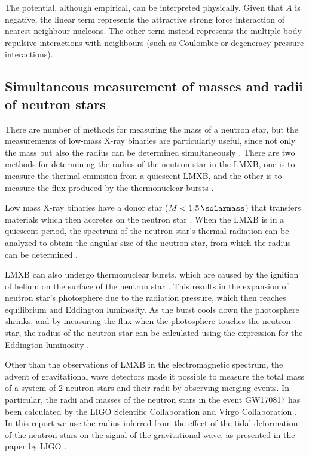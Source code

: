\documentclass[draft,11pt]{article}
\theoremstyle{definition}
\theoremstyle{remark}
\begin{document}
                The potential, although empirical, can be interpreted physically. Given that $A$ is negative, the linear term represents the attractive strong force interaction of nearest neighbour nucleons. The other term instead represents the multiple body repulsive interactions with neighbours \parencite{bludman.dover.1980/extrapolation.skyrme.eos} (such as Coulombic or degeneracy pressure interactions).
            
        \subsection{Simultaneous measurement of masses and radii of neutron stars}
            There are number of methods for measuring the mass of a neutron star, but the measurements of low-mass X-ray binaries are particularly useful, since not only the mass but also the radius can be determined simultaneously \parencite{ozel.paulo.2016/masses.radii.eos}. There are two methods for determining the radius of the neutron star in the LMXB, one is to measure the thermal emmision from a quiescent LMXB, and the other is to measure the flux produced by the thermonuclear bursts \parencite{ozel.paulo.2016/masses.radii.eos}.
            
            Low mass X-ray binaries have a donor star ($M<\SI{1.5}{\solarmass}$) that transfers materials which then accretes on the neutron star \parencite{tauris.2003/xray.binary}. When the LMXB is in a quiescent period, the spectrum of the neutron star's thermal radiation can be analyzed to obtain the angular size of the neutron star, from which the radius can be determined \parencite{ozel.psaltis.2016/radius.oberve}.
            
            LMXB can also undergo thermonuclear bursts, which are caused by the ignition of helium on the surface of the neutron star \parencite{ozel.paulo.2016/masses.radii.eos}. This results in the expansion of neutron star's photosphere due to the radiation pressure, which then reaches equilibrium and Eddington luminosity. As the burst cools down the photosphere shrinks, and by measuring the flux when the photosphere touches the neutron star, the radius of the neutron star can be calculated using the expression for the Eddington luminosity \parencite{ozel.psaltis.2016/radius.oberve}.
            
            Other than the observations of LMXB in the electromagnetic spectrum, the advent of gravitational wave detectors made it possible to measure the total mass of a system of 2 neutron stars and their radii by observing merging events. In particular, the  radii and masses of the neutron stars in the event GW170817 has been calculated by the LIGO Scientific Collaboration and Virgo Collaboration \cite{ligo.virgo.2019/prop.of.ns.merger.GW170817,ligo.virgo.2018/GW170817.ns.radii}. In this report we use the radius inferred from the effect of the tidal deformation of the neutron stars on the signal of the gravitational wave, as presented in the paper by LIGO \cite{ligo.virgo.2018/GW170817.ns.radii}.
    
\end{document}
